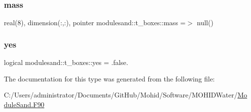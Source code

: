 \subsubsection{\texorpdfstring{mass}{mass}}
{\footnotesize\ttfamily real(8), dimension(\+:,\+:), pointer modulesand\+::t\+\_\+boxes\+::mass =$>$ null()\hspace{0.3cm}{\ttfamily [private]}}

\mbox{\label{structmodulesand_1_1t__boxes_a4e9a10d4635fd7dc7f7a8c0d460bb57b}} 
\subsubsection{\texorpdfstring{yes}{yes}}
{\footnotesize\ttfamily logical modulesand\+::t\+\_\+boxes\+::yes = .false.\hspace{0.3cm}{\ttfamily [private]}}



The documentation for this type was generated from the following file\+:\begin{DoxyCompactItemize}
\item 
C\+:/\+Users/administrator/\+Documents/\+Git\+Hub/\+Mohid/\+Software/\+M\+O\+H\+I\+D\+Water/\mbox{\hyperlink{_module_sand_8_f90}{Module\+Sand.\+F90}}\end{DoxyCompactItemize}
